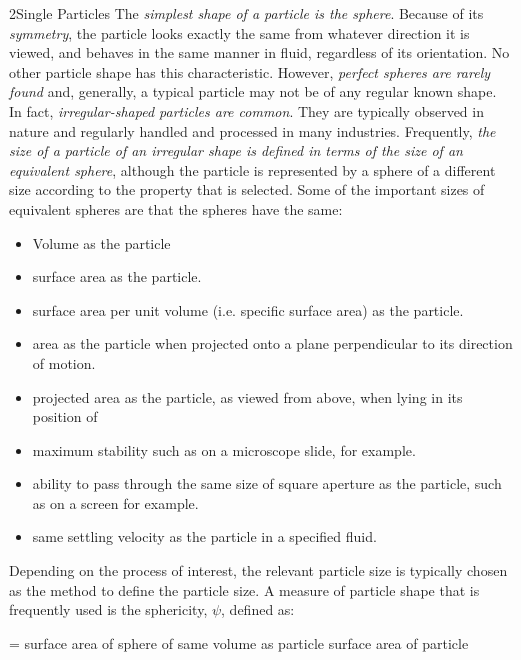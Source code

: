 \documentclass[OSF-Notebook.tex]{subfiles}
\begin{document}
\begin{sectionBox}2{Single Particles} %
The \emph{simplest shape of a particle is the sphere}. Because of its \emph{symmetry}, the particle looks exactly the same from whatever direction it is viewed, and behaves in the same manner in fluid, regardless of its orientation. No other particle shape has this characteristic. However, \emph{perfect spheres are rarely found} and, generally, a typical particle may not be of any regular known shape. In fact, \emph{irregular-shaped particles are common}. They are typically observed in nature and regularly handled and processed in many industries. Frequently, \emph{the size of a particle of an irregular shape is defined in terms of the size of an equivalent sphere}, although the particle is represented by a sphere of a different size according to the property that is selected. Some of the important sizes of equivalent spheres are that the spheres have the same:
  \begin{itemize}
    \item Volume as the particle
    \item surface area as the particle.
    \item surface area per unit volume (i.e. specific surface area) as the particle.
    \item area as the particle when projected onto a plane perpendicular to its direction of motion.
    \item projected area as the particle, as viewed from above, when lying in its position of
    \item maximum stability such as on a microscope slide, for example.
    \item ability to pass through the same size of square aperture as the particle, such as on a screen for example.
    \item same settling velocity as the particle in a specified fluid.
  \end{itemize}
  Depending on the process of interest, the relevant particle size is typically chosen as the method to define the particle size. A measure of particle shape that is frequently used is the sphericity, \(\psi\), defined as:
  \begin{BM}
    \psi=\frac
    {surface area of sphere of same volume as particle}
    {surface area of particle}
  \end{BM}
\end{sectionBox}
\end{document}
